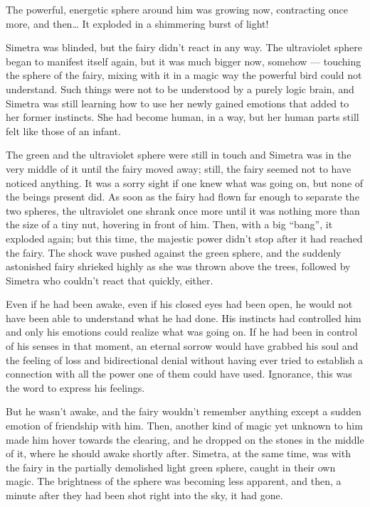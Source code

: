 The powerful, energetic sphere around him was growing now, contracting once more, and then\dots
It exploded in a shimmering burst of light!

Simetra was blinded, but the fairy didn't react in any way. The ultraviolet sphere began to manifest itself again, but it was much bigger now, somehow --- touching the sphere of the fairy, mixing with it in a magic way the powerful bird could not understand. Such things were not to be understood by a purely logic brain, and Simetra was still learning how to use her newly gained emotions that added to her former instincts. She had become human, in a way, but her human parts still felt like those of an infant.

The green and the ultraviolet sphere were still in touch and Simetra was in the very middle of it until the fairy moved away; still, the fairy seemed not to have noticed anything. It was a sorry sight if one knew what was going on, but none of the beings present did. 
As soon as the fairy had flown far enough to separate the two spheres, the ultraviolet one shrank once more until it was nothing more than the size of a tiny nut, hovering in front of him. 
Then, with a big \enquote{bang}, it exploded again; but this time, the majestic power didn't stop after it had reached the fairy. The shock wave pushed against the green sphere, and the suddenly astonished fairy shrieked highly as she was thrown above the trees, followed by Simetra who couldn't react that quickly, either.

Even if he had been awake, even if his closed eyes had been open, he would not have been able to understand what he had done. His instincts had controlled him and only his emotions could realize what was going on. If he had been in control of his senses in that moment, an eternal sorrow would have grabbed his soul and the feeling of loss and bidirectional denial without having ever tried to establish a connection with all the power one of them could have used. Ignorance, this was the word to express his feelings.

But he wasn't awake, and the fairy wouldn't remember anything except a sudden emotion of friendship with him. 
Then, another kind of magic yet unknown to him made him hover towards the clearing, and he dropped on the stones in the middle of it, where he should awake shortly after. 
Simetra, at the same time, was with the fairy in the partially demolished light green sphere, caught in their own magic. The brightness of the sphere was becoming less apparent, and then, a minute after they had been shot right into the sky, it had gone.

